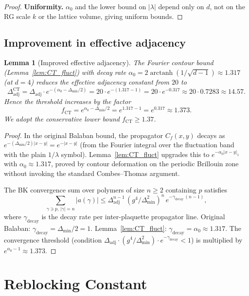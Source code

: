 \documentclass[11pt,a4paper]{amsart}
\newtheorem{lemma}[theorem]{Lemma}
\theoremstyle{definition}
\newcommand{\Del}{\Delta_{\min}}
\newcommand{\Cf}{C_f}
\begin{document}
\begin{proof}
\textbf{Uniformity.}
$\alpha_0$ and the lower bound on $|\lambda|$ depend only on $d$, not on the RG
scale $k$ or the lattice volume, giving uniform bounds.
\end{proof}

\subsection{Improvement in effective adjacency}

\begin{lemma}[Improved effective adjacency]
\label{lem:adj_CT}
The Fourier contour bound (Lemma~\ref{lem:CT_fluct}) with decay rate
$\alpha_0 = 2\operatorname{arctanh}(1/\sqrt{d-1}) \approx 1.317$ (at $d=4$)
reduces the effective adjacency constant from $20$ to
\[
  \Delta^{\mathrm{CT}}_{\mathrm{adj}}
  = \Delta_{\mathrm{adj}} \cdot e^{-(\alpha_0 - \Del/2)}
  = 20 \cdot e^{-(1.317-1)}
  = 20 \cdot e^{-0.317}
  \approx 20 \cdot 0.7283
  \approx 14.57.
\]
Hence the threshold increases by the factor
\[
  f_{\mathrm{CT}}
  = e^{\alpha_0 - \Del/2}
  = e^{1.317-1}
  = e^{0.317}
  \approx 1.373.
\]
We adopt the conservative lower bound $f_{\mathrm{CT}} \ge 1.37$.
\end{lemma}
\begin{proof}
In the original Balaban bound, the propagator $\Cf(x,y)$ decays as
$e^{-(\Del/2)|x-y|} = e^{-|x-y|}$ (from the Fourier integral over the
fluctuation band with the plain $1/\lambda$ symbol).
Lemma~\ref{lem:CT_fluct} upgrades this to $e^{-\alpha_0 |x-y|_1}$ with
$\alpha_0 \approx 1.317$, proved by contour deformation on the periodic
Brillouin zone without invoking the standard Combes--Thomas argument.

The BK convergence sum over polymers of size $n\ge 2$ containing $p$ satisfies
\[
  \sum_{\gamma\ni p,\,|\gamma|=n} |a(\gamma)|
  \le \Delta_{\mathrm{adj}}^{n-1}\,
      (g^4/\Del^2)^n\,e^{-\gamma_{\mathrm{decay}}\,(n-1)},
\]
where $\gamma_{\mathrm{decay}}$ is the decay rate per inter-plaquette propagator
line.
Original Balaban: $\gamma_{\mathrm{decay}} = \Del/2 = 1$.
Lemma~\ref{lem:CT_fluct}: $\gamma_{\mathrm{decay}} = \alpha_0 \approx 1.317$.
The convergence threshold (condition
$\Delta_{\mathrm{adj}}\cdot(g^4/\Del^2)\cdot e^{-\gamma_{\mathrm{decay}}} < 1$)
is multiplied by $e^{\alpha_0 - 1} \approx 1.373$.
\end{proof}

\section{Reblocking Constant}
\label{sec:reblock}
\end{document}
